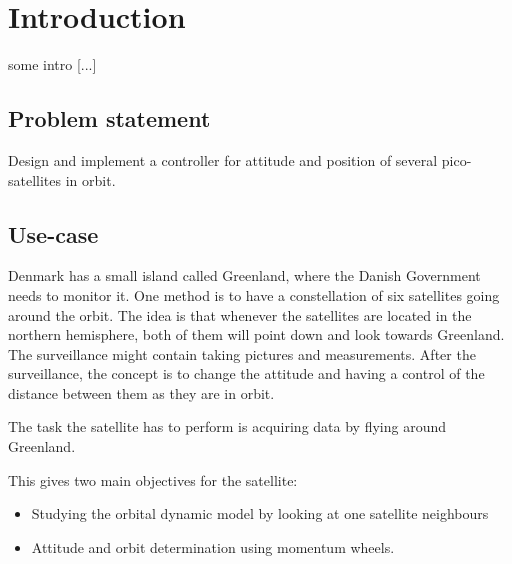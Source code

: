 \chapter{Introduction}\label{chap:Introduction}
%
\cite{Biezl}
some intro [...]

%
\section{Problem statement}
%
Design and implement a controller for attitude and position of several pico-satellites in orbit.
%
\section{Use-case}\label{sec:useCase}
%
Denmark has a small island called Greenland, where the Danish Government needs to monitor it.
One method is to have a constellation of six satellites going around the orbit. The idea is that whenever the satellites are located in the northern hemisphere, both of them will point down and look towards Greenland. The surveillance might contain taking pictures and measurements. After the surveillance, the concept is to change the attitude and having a control of the distance between them as they are in orbit.

The task the satellite has to perform is acquiring data by flying around Greenland.

This gives two main objectives for the satellite: 
\vspace{-0.5cm}
\begin{itemize}
	\item Studying the orbital dynamic model by looking at one satellite neighbours 
	\item Attitude and orbit determination using momentum wheels.
\end{itemize}
%